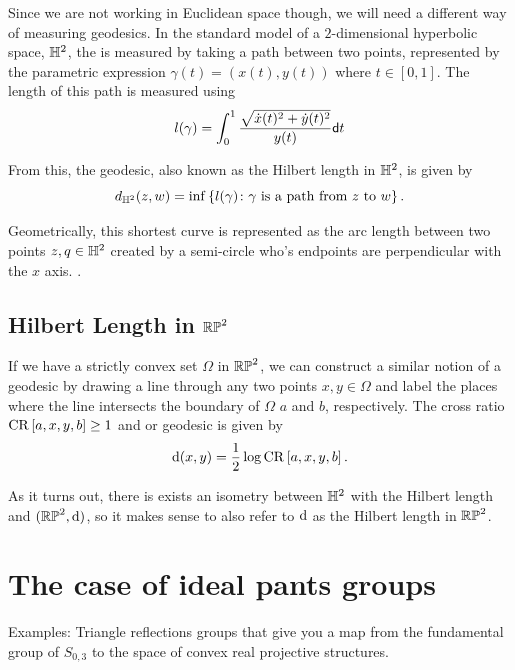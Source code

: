 \documentclass{amsart}
\begin{document}
Since we are not working in Euclidean space though, we will need a different way of measuring geodesics. In the standard model of a $2$-dimensional hyperbolic space, $\mathbb{H}^2$, the  is measured by taking a path between two points, represented by the parametric expression $\gamma(t) = (x(t), y(t))$ where $t \in [0,1]$. The length of this path is measured using
\begin{equation*}
	l(\gamma) = \int_{0}^{1} \frac{\sqrt{\dot{x}(t)^2 + \dot{y}(t)^2}}{y(t)} \mathsf{d} t
\end{equation*}

From this, the geodesic, also known as the Hilbert length in $\mathbb{H}^2$, is given by
\begin{equation*}
	d_{\mathbb{H}^2}(z,w) = \inf \left\{l(\gamma) \colon \gamma \text{ is a path from } z \text{ to } w\right\}.
\end{equation*}

Geometrically, this shortest curve is represented as the arc length between two points $z,q \in \mathbb{H}^2$ created by a semi-circle who's endpoints are perpendicular with the $x$ axis. .

\subsection{Hilbert Length in $\mathbb{RP}^2$}

If we have a strictly convex set $\Omega$ in $\mathbb{RP}^2$, we can construct a similar notion of a geodesic by drawing a line through any two points $x,y \in \Omega$ and label the places where the line intersects the boundary of $\Omega$ $a$ and $b$, respectively. The cross ratio $\operatorname{CR}\left[a,x,y,b\right] \geq 1$ and or geodesic is given by
\begin{equation*}
	\operatorname{d}(x,y) = \frac{1}{2} \log \operatorname{CR}\left[a,x,y,b\right].
\end{equation*}

As it turns out, there is exists an isometry between $\mathbb{H}^2$ with the Hilbert length and $(\mathbb{RP}^2, \operatorname{d})$, so it makes sense to also refer to $\operatorname{d}$ as the Hilbert length in $\mathbb{RP}^2$. 

\section{The case of ideal pants groups}
Examples: Triangle reflections groups that give you a map from the fundamental group of $S_{0,3}$ to the space of convex real projective structures.
\end{document}
